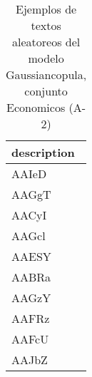 \begin{table}[H]
\centering
\fontsize{8}{14}\selectfont
\caption{Ejemplos de textos aleatoreos del modelo Gaussiancopula, conjunto Economicos (A-2)}
\label{table-sample10-economicos-a-2-gaussiancopula-text}
\begin{tabular}{|m{50em}|}
\hline
\rowcolor[gray]{0.8}
description \\
\hline AAIeD \\
\hline AAGgT \\
\hline AACyI \\
\hline AAGcl \\
\hline AAESY \\
\hline AABRa \\
\hline AAGzY \\
\hline AAFRz \\
\hline AAFcU \\
\hline AAJbZ \\
\hline
\end{tabular}
\end{table}
